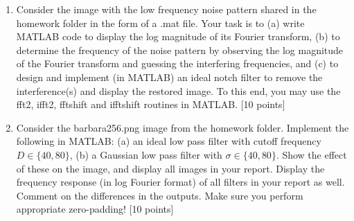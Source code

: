 \documentclass[11pt]{article}
\begin{document}
\begin{enumerate}
\item Consider the image with the low frequency noise pattern shared in the homework folder in the form of a .mat file. Your task is to (a) write MATLAB code to display the log magnitude of its Fourier transform, (b) to determine the frequency of the noise pattern by observing the log magnitude of the Fourier transform and guessing the interfering frequencies, and (c) to design and implement (in MATLAB) an ideal notch filter to remove the interference(s) and display the restored image. To this end, you may use the fft2, ifft2, fftshift and ifftshift routines in MATLAB. \textsf{[10 points]}

\item Consider the barbara256.png image from the homework folder. Implement the following in MATLAB: (a) an ideal low pass filter with cutoff frequency $D \in \{40, 80\}$, (b) a Gaussian low pass filter with $\sigma \in \{40,80\}$. Show the effect of these on the image, and display all images in your report. Display the frequency response (in log Fourier format) of all filters in your report as well. Comment on the differences in the outputs. Make sure you perform appropriate zero-padding! \textsf{[10 points]}


\end{enumerate}
\end{document}
